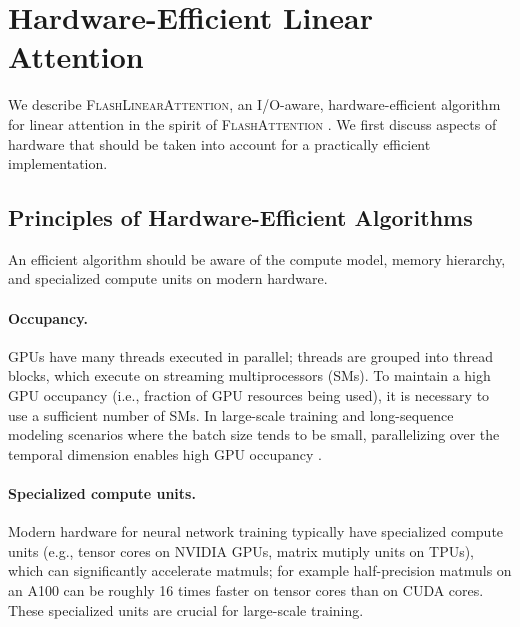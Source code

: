 \vspace{-2mm}
\section{Hardware-Efficient Linear Attention}
\vspace{-2mm}
\label{sec:algorithm}
We describe \textsc{FlashLinearAttention}, an I/O-aware, hardware-efficient algorithm for linear attention in the spirit of \textsc{FlashAttention} \cite{flashattention1,flashattention2}. We first discuss aspects of hardware that should be taken into account for a practically efficient implementation.

\vspace{-2mm}
\subsection{Principles of Hardware-Efficient Algorithms}
\vspace{-2mm}
 An efficient  algorithm should be aware of the compute model, memory hierarchy, and specialized compute units on modern hardware. 




\vspace{-2mm}
\paragraph{Occupancy.} GPUs have many threads executed in parallel; threads are grouped into thread blocks, which execute on streaming multiprocessors (SMs). To maintain a high GPU occupancy (i.e., fraction of GPU resources being used), it is necessary to use a sufficient number of SMs. 
In large-scale training and long-sequence modeling scenarios where the batch size tends to be small, 
parallelizing over the temporal dimension enables high GPU occupancy \cite{flashattention2}. 


\vspace{-2mm}
\paragraph{Specialized compute units.} Modern hardware for neural network training typically have specialized compute units (e.g., {tensor cores} on NVIDIA GPUs, matrix mutiply units on TPUs), which can significantly accelerate matmuls; for example half-precision matmuls
%
on an A100 can be roughly 16 times faster on tensor cores than on CUDA cores. These specialized units are crucial for large-scale training.


